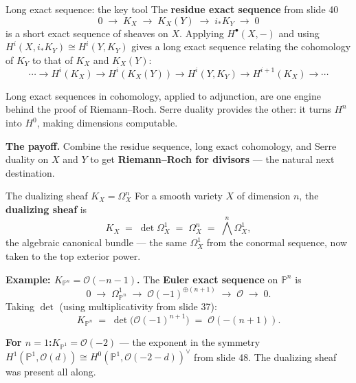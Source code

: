 \documentclass[aspectratio=169,12pt]{beamer}
\newenvironment{mathbox}{%
  \begin{tcolorbox}[mathbox]}{%
  \end{tcolorbox}}
\begin{document}
\begin{frame}{Long exact sequence: the key tool}
  The \textbf{residue exact sequence} from slide 40
  \[
    0 \;\to\; K_X \;\to\; K_X(Y) \;\to\; i_* K_Y \;\to\; 0
  \]
  is a short exact sequence of sheaves on $X$.
  Applying $H^\bullet(X, -)$ and using $H^i(X, i_* K_Y) \cong H^i(Y, K_Y)$
  gives a long exact sequence relating the cohomology of $K_Y$
  to that of $K_X$ and $K_X(Y)$:
  \[
    \cdots \to H^i(K_X) \to H^i(K_X(Y))
    \to H^i(Y, K_Y) \to H^{i+1}(K_X) \to \cdots
  \]

  \smallskip

  \begin{mathbox}
    Long exact sequences in cohomology, applied to adjunction, are
    one engine behind the proof of Riemann--Roch.
    Serre duality provides the other: it turns $H^n$ into $H^0$,
    making dimensions computable.
  \end{mathbox}

  \textbf{The payoff.}\enspace
  Combine the residue sequence, long exact cohomology,
  and Serre duality on $X$ and $Y$ to get
  \textbf{Riemann--Roch for divisors} — the natural next destination.
\end{frame}

\begin{frame}{The dualizing sheaf $K_X = \Omega^n_X$}
  For a smooth variety $X$ of dimension $n$, the \textbf{dualizing sheaf} is
  \[
    K_X \;=\; \det \Omega^1_X \;=\; \Omega^n_X
    \;=\; \textstyle\bigwedge^{\!n} \Omega^1_X,
  \]
  the algebraic canonical bundle — the same $\Omega^1_X$ from the conormal
  sequence, now taken to the top exterior power.

  \medskip

  \textbf{Example: $K_{\mathbb{P}^n} = \mathcal{O}(-n-1)$.}\enspace
  The \textbf{Euler exact sequence} on $\mathbb{P}^n$ is
  \[
    0 \;\longrightarrow\; \Omega^1_{\mathbb{P}^n}
      \;\longrightarrow\; \mathcal{O}(-1)^{\oplus(n+1)}
      \;\longrightarrow\; \mathcal{O} \;\longrightarrow\; 0.
  \]
  Taking $\det$ (using multiplicativity from slide 37):
  \[
    K_{\mathbb{P}^n}
    \;=\; \det\bigl(\mathcal{O}(-1)^{n+1}\bigr)
    \;=\; \mathcal{O}(-(n+1)).
  \]

  \textbf{For $n=1$:}\enspace $K_{\mathbb{P}^1} = \mathcal{O}(-2)$ —
  the exponent in the symmetry $H^1(\mathbb{P}^1, \mathcal{O}(d))
  \cong H^0(\mathbb{P}^1, \mathcal{O}(-2-d))^\vee$ from slide 48.
  The dualizing sheaf was present all along.
\end{frame}
\end{document}
